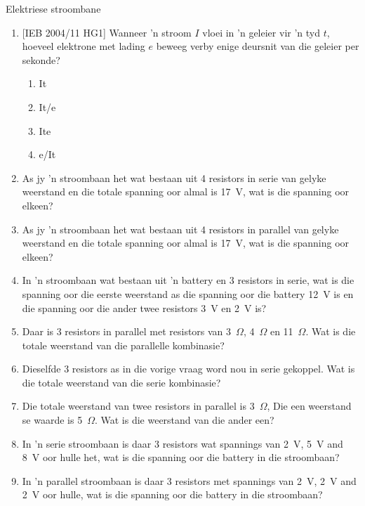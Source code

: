 \begin{eocexercises}{Elektriese stroombane}
\begin{enumerate}[noitemsep, label=\textbf{\arabic*}. ]
{}

\item{[IEB 2004/11 HG1] Wanneer 'n stroom $I$ vloei in 'n geleier vir
 'n tyd $t$, hoeveel elektrone met lading $e$ beweeg verby enige deursnit van die
geleier per sekonde?
\begin{enumerate}[noitemsep, label=\textbf{\alph*}. ] 
\item{It}
\item{It/e}
\item{Ite}
\item{e/It}
\end{enumerate}}


\item As jy 'n stroombaan het wat bestaan uit 4 resistors in serie van gelyke weerstand en die totale spanning oor almal is 17~V, wat is die spanning oor elkeen?

\item As jy 'n stroombaan het wat bestaan uit 4 resistors in parallel van gelyke weerstand en die totale spanning oor almal is 17~V, wat is die spanning oor elkeen?

\item In 'n stroombaan wat bestaan uit 'n battery en 3 resistors in serie, wat is die spanning oor die eerste weerstand as die spanning oor die battery 12~V is en die spanning oor die ander twee resistors 3~V en 2~V is?

\item Daar is 3 resistors in parallel met resistors van 3~$\Omega$, 4~$\Omega$ en 11~$\Omega$.  Wat is die totale weerstand van die parallelle kombinasie?

\item Dieselfde 3 resistors as in die vorige vraag word nou in serie gekoppel. Wat is die totale weerstand van die serie kombinasie?

\item Die totale weerstand van twee resistors in parallel is 3~$\Omega$, Die een weerstand se waarde is 5~$\Omega$. Wat is die weerstand van die ander een?

\item In 'n serie stroombaan is daar 3 resistors wat spannings van 2~V, 5~V and 8~V oor hulle het, wat is die spanning oor die battery in die stroombaan?

\item In 'n parallel stroombaan is daar 3 resistors met spannings van 2~V, 2~V and 2~V oor hulle, wat is die spanning oor die battery in die stroombaan?




\end{enumerate}
\end{eocexercises}
